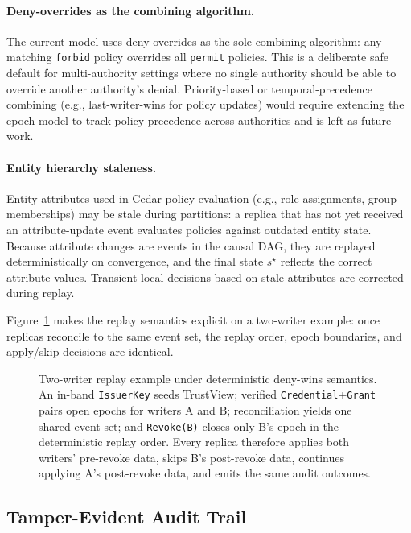 \documentclass[10pt,journal,compsoc]{IEEEtran}
\begin{document}
\paragraph{Deny-overrides as the combining algorithm.}
The current model uses deny-overrides as the sole combining algorithm: any matching \texttt{forbid} policy overrides all \texttt{permit} policies. This is a deliberate safe default for multi-authority settings where no single authority should be able to override another authority's denial. Priority-based or temporal-precedence combining (e.g., last-writer-wins for policy updates) would require extending the epoch model to track policy precedence across authorities and is left as future work.

\paragraph{Entity hierarchy staleness.}
Entity attributes used in Cedar policy evaluation (e.g., role assignments, group memberships) may be stale during partitions: a replica that has not yet received an attribute-update event evaluates policies against outdated entity state. Because attribute changes are events in the causal DAG, they are replayed deterministically on convergence, and the final state $s^\star$ reflects the correct attribute values. Transient local decisions based on stale attributes are corrected during replay.

Figure~\ref{fig:deny-wins-paperC} makes the replay semantics explicit on a two-writer example: once replicas reconcile to the same event set, the replay order, epoch boundaries, and apply/skip decisions are identical.

\begin{figure}[htbp]
\centering
\resizebox{\textwidth}{!}{}
\caption{Two-writer replay example under deterministic deny-wins semantics. An in-band \texttt{IssuerKey} seeds TrustView; verified \texttt{Credential}+\texttt{Grant} pairs open epochs for writers A and B; reconciliation yields one shared event set; and \texttt{Revoke(B)} closes only B's epoch in the deterministic replay order. Every replica therefore applies both writers' pre-revoke data, skips B's post-revoke data, continues applying A's post-revoke data, and emits the same audit outcomes.}
\label{fig:deny-wins-paperC}
\end{figure}


\subsection{Tamper-Evident Audit Trail}
\end{document}
